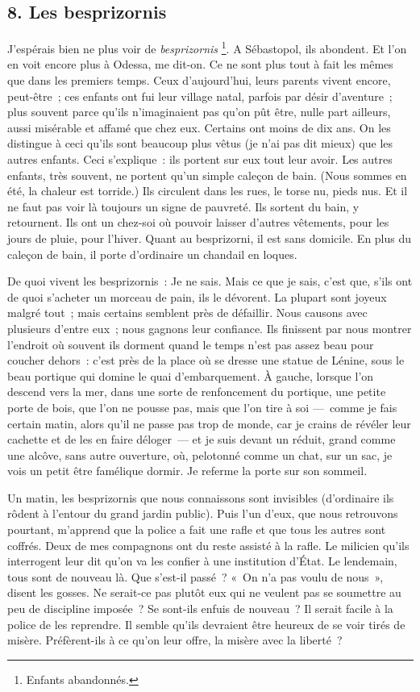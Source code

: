 \documentclass[french,twoside]{book} %
\begin{document}
\subsection[{8. Les besprizornis}]{8. Les besprizornis}
\noindent J’espérais bien ne plus voir de \emph{besprizornis} \footnote{Enfants abandonnés.}. A Sébastopol, ils abondent. Et l’on en voit encore plus à Odessa, me dit-on. Ce ne sont plus tout à fait les mêmes que dans les premiers temps. Ceux d’aujourd’hui, leurs parents vivent encore, peut-être ; ces enfants ont fui leur village natal, parfois par désir d’aventure ; plus souvent parce qu’ils n’imaginaient pas qu’on pût être, nulle part ailleurs, aussi misérable et affamé que chez eux. Certains ont moins de dix ans. On les distingue à ceci qu’ils sont beaucoup plus vêtus (je n’ai pas dit mieux) que les autres enfants. Ceci s’explique : ils portent sur eux tout leur avoir. Les autres enfants, très souvent, ne portent qu’un simple caleçon de bain. (Nous sommes en été, la chaleur est torride.) Ils circulent dans les rues, le torse nu, pieds nus. Et il ne faut pas voir là toujours un signe de pauvreté. Ils sortent du bain, y retournent. Ils ont un chez-soi où pouvoir laisser d’autres vêtements, pour les jours de pluie, pour l’hiver. Quant au besprizorni, il est sans domicile. En plus du caleçon de bain, il porte d’ordinaire un chandail en loques.\par
De quoi vivent les besprizornis : Je ne sais. Mais ce que je sais, c’est que, s’ils ont de quoi s’acheter un morceau de pain, ils le dévorent. La plupart sont joyeux malgré tout ; mais certains semblent près de défaillir. Nous causons avec plusieurs d’entre eux ; nous gagnons leur confiance. Ils finissent par nous montrer l’endroit où souvent ils dorment quand le temps n’est pas assez beau pour coucher dehors : c’est près de la place où se dresse une statue de Lénine, sous le beau portique qui domine le quai d’embarquement. À gauche, lorsque l’on descend vers la mer, dans une sorte de renfoncement du portique, une petite porte de bois, que l’on ne pousse pas, mais que l’on tire à soi — comme je fais certain matin, alors qu’il ne passe pas trop de monde, car je crains de révéler leur cachette et de les en faire déloger — et je suis devant un réduit, grand comme une alcôve, sans autre ouverture, où, pelotonné comme un chat, sur un sac, je vois un petit être famélique dormir. Je referme la porte sur son sommeil.\par
Un matin, les besprizornis que nous connaissons sont invisibles (d’ordinaire ils rôdent à l’entour du grand jardin public). Puis l’un d’eux, que nous retrouvons pourtant, m’apprend que la police a fait une rafle et que tous les autres sont coffrés. Deux de mes compagnons ont du reste assisté à la rafle. Le milicien qu’ils interrogent leur dit qu’on va les confier à une institution d’État. Le lendemain, tous sont de nouveau là. Que s’est-il passé ? « On n’a pas voulu de nous », disent les gosses. Ne serait-ce pas plutôt eux qui ne veulent pas se soumettre au peu de discipline imposée ? Se sont-ils enfuis de nouveau ? Il serait facile à la police de les reprendre. Il semble qu’ils devraient être heureux de se voir tirés de misère. Préfèrent-ils à ce qu’on leur offre, la misère avec la liberté ?\par
\end{document}
